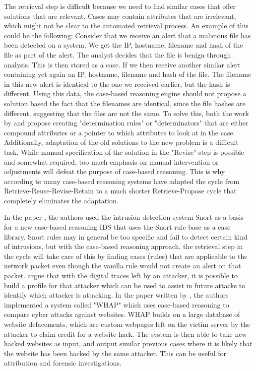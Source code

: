 The retrieval step is difficult because we need to find similar cases that offer solutions that are relevant. Cases may contain attributes that are irrelevant, which might not be clear to the automated retrieval process.
An example of this could be the following: Consider that we receive an alert that a malicious file has been detected on a system. We get the IP, hostname, filename and hash of the file as part of the alert. The analyst decides that the file is benign through analysis. This is then stored as a case. If we then receive another similar alert containing yet again an IP, hostname, filename and hash of the file. The filename in this new alert is identical to the one we received earlier, but the hash is different. Using this data, the case-based reasoning engine should not propose a solution based the fact that the filenames are identical, since the file hashes are different, suggesting that the files are not the same.
To solve this, both the work by \textcite{lewis_1993} and \textcite{davies_1987} propose creating "determination rules" or "determinators" that are either compound attributes or a pointer to which attributes to look at in the case.
Additionally, adaptation of the old solutions to the new problem is a difficult task. While manual specification of the solution in the "Revise" step is possible and somewhat required, too much emphasis on manual intervention or adjustments will defeat the purpose of case-based reasoning. This is why according to \textcite{leake_1996} many case-based reasoning systems have adapted the cycle from Retrieve-Reuse-Revise-Retain to a much shorter Retrieve-Propose cycle that completely eliminates the adaptation.

In the paper , the authors \textcite{schwartz_2002} used the intrusion detection system Snort as a basis for a new case-based reasoning IDS that uses the Snort rule base as a case library. Snort rules may in general be too specific and fail to detect certain kind of intrusions, but with the case-based reasoning approach, the retrieval step in the cycle will take care of this by finding cases (rules) that are applicable to the network packet even though the vanilla rule would not create an alert on that packet.
\textcite{Kapetanakis_2014} argue that with the digital traces left by an attacker, it is possible to build a profile for that attacker which can be used to assist in future attacks to identify which attacker is attacking. In the paper written by \textcite{han_2016}, the authors implemented a system called "WHAP" which uses case-based reasoning to compare cyber attacks against websites. WHAP builds on a large database of website defacements, which are custom webpages left on the victim server by the attacker to claim credit for a website hack. The system is then able to take new hacked websites as input, and output similar previous cases where it is likely that the website has been hacked by the same attacker. This can be useful for attribution and forensic investigations.

